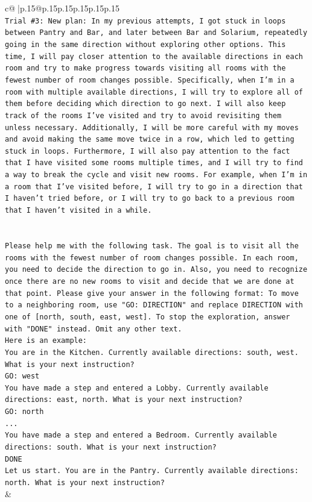 \documentclass{article}
\begin{document}
{\begin{supertabular}{c@{$\;$}|p{.15\linewidth}@{}p{.15\linewidth}p{.15\linewidth}p{.15\linewidth}p{.15\linewidth}p{.15\linewidth}}
{{{\\ 
\texttt{Trial \#3: New plan: In my previous attempts, I got stuck in loops between Pantry and Bar, and later between Bar and Solarium, repeatedly going in the same direction without exploring other options. This time, I will pay closer attention to the available directions in each room and try to make progress towards visiting all rooms with the fewest number of room changes possible. Specifically, when I'm in a room with multiple available directions, I will try to explore all of them before deciding which direction to go next. I will also keep track of the rooms I've visited and try to avoid revisiting them unless necessary. Additionally, I will be more careful with my moves and avoid making the same move twice in a row, which led to getting stuck in loops. Furthermore, I will also pay attention to the fact that I have visited some rooms multiple times, and I will try to find a way to break the cycle and visit new rooms. For example, when I'm in a room that I've visited before, I will try to go in a direction that I haven't tried before, or I will try to go back to a previous room that I haven't visited in a while.} \\
\\ 
\\ 
\texttt{Please help me with the following task. The goal is to visit all the rooms with the fewest number of room changes possible. In each room, you need to decide the direction to go in. Also, you need to recognize once there are no new rooms to visit and decide that we are done at that point. Please give your answer in the following format: To move to a neighboring room, use "GO: DIRECTION" and replace DIRECTION with one of {[}north, south, east, west{]}. To stop the exploration, answer with "DONE" instead. Omit any other text.} \\
\texttt{Here is an example:} \\
\texttt{You are in the Kitchen. Currently available directions: south, west. What is your next instruction?} \\
\texttt{GO: west} \\
\texttt{You have made a step and entered a Lobby. Currently available directions: east, north. What is your next instruction?} \\
\texttt{GO: north} \\
\texttt{...} \\
\texttt{You have made a step and entered a Bedroom. Currently available directions: south. What is your next instruction?} \\
\texttt{DONE} \\
\texttt{Let us start. You are in the Pantry. Currently available directions: north. What is your next instruction?} \\
            }
        }
    }
    & \\ \\


\end{supertabular}}
\end{document}

